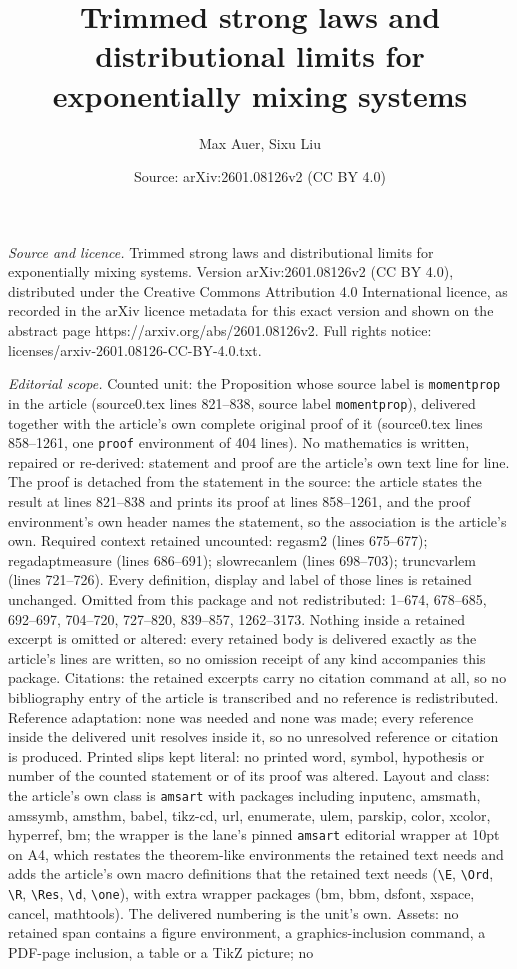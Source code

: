 \documentclass[10pt,a4paper]{amsart}
\title[Trimmed strong laws and distributional limits for exponentia]{Trimmed strong laws and distributional limits for exponentially mixing systems}
\author{Max Auer, Sixu Liu}
\date{Source: arXiv:2601.08126v2 (CC BY 4.0)}
\begin{document}
\maketitle

\noindent\emph{Source and licence.} Trimmed strong laws and distributional limits for exponentially mixing systems. Version arXiv:2601.08126v2 (CC BY 4.0), distributed under the Creative Commons Attribution 4.0 International licence, as recorded in the arXiv licence metadata for this exact version and shown on the abstract page https://arxiv.org/abs/2601.08126v2. Full rights notice: licenses/arxiv-2601.08126-CC-BY-4.0.txt.\par\smallskip

\noindent\textit{Editorial scope.} Counted unit: the Proposition whose source label is \texttt{momentprop} in the article (source0.tex lines 821--838, source label \texttt{momentprop}), delivered together with the article's own complete original proof of it (source0.tex lines 858--1261, one \texttt{proof} environment of 404 lines). No mathematics is written, repaired or re-derived: statement and proof are the article's own text line for line. The proof is detached from the statement in the source: the article states the result at lines 821--838 and prints its proof at lines 858--1261, and the proof environment's own header names the statement, so the association is the article's own. Required context retained uncounted: regasm2 (lines 675--677); regadaptmeasure (lines 686--691); slowrecanlem (lines 698--703); truncvarlem (lines 721--726). Every definition, display and label of those lines is retained unchanged. Omitted from this package and not redistributed: 1--674, 678--685, 692--697, 704--720, 727--820, 839--857, 1262--3173. Nothing inside a retained excerpt is omitted or altered: every retained body is delivered exactly as the article's lines are written, so no omission receipt of any kind accompanies this package. Citations: the retained excerpts carry no citation command at all, so no bibliography entry of the article is transcribed and no reference is redistributed. Reference adaptation: none was needed and none was made; every reference inside the delivered unit resolves inside it, so no unresolved reference or citation is produced. Printed slips kept literal: no printed word, symbol, hypothesis or number of the counted statement or of its proof was altered. Layout and class: the article's own class is \texttt{amsart} with packages including inputenc, amsmath, amssymb, amsthm, babel, tikz-cd, url, enumerate, ulem, parskip, color, xcolor, hyperref, bm; the wrapper is the lane's pinned \texttt{amsart} editorial wrapper at 10pt on A4, which restates the theorem-like environments the retained text needs and adds the article's own macro definitions that the retained text needs (\texttt{\textbackslash E}, \texttt{\textbackslash Ord}, \texttt{\textbackslash R}, \texttt{\textbackslash Res}, \texttt{\textbackslash d}, \texttt{\textbackslash one}), with extra wrapper packages (bm, bbm, dsfont, xspace, cancel, mathtools). The delivered numbering is the unit's own. Assets: no retained span contains a figure environment, a graphics-inclusion command, a PDF-page inclusion, a table or a TikZ picture; no 
\end{document}
